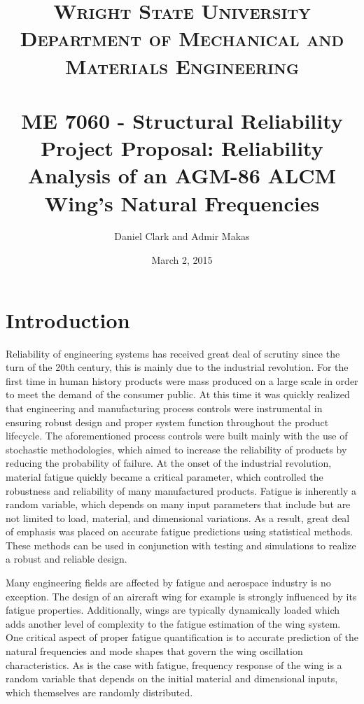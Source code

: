 \documentclass[paper=a4, fontsize=12pt]{scrartcl} %
\title{	
\normalfont \normalsize 
\textsc{Wright State University\\ Department of Mechanical and Materials Engineering} \\ [25pt] %
\horrule{0.5pt} \\[0.4cm] %
\huge ME 7060 - Structural Reliability \\ %
\Large Project Proposal: Reliability Analysis of an AGM-86 ALCM Wing's Natural Frequencies
\horrule{2pt} \\[0.5cm] %
}
\author{Daniel Clark and Admir Makas} %
\date{\normalsize March 2, 2015} %
\begin{document}
\maketitle %

\section*{Introduction}
Reliability of engineering systems has received great deal of scrutiny since the turn of the 20th century, this is mainly due to the industrial revolution. For the first time in human history products were mass produced on a large scale in order to meet the demand of the consumer public. At this time it was quickly realized that engineering and manufacturing process controls were instrumental in ensuring robust design and proper system function throughout the product lifecycle. The aforementioned process controls were built mainly with the use of stochastic methodologies, which aimed to increase the reliability of products by reducing the probability of failure. At the onset of the industrial revolution, material fatigue quickly became a critical parameter, which controlled the robustness and reliability of many manufactured products. Fatigue is inherently a random variable, which depends on many input parameters that include but are not limited to load, material, and dimensional variations. As a result, great deal of emphasis was placed on accurate fatigue predictions using statistical methods. These methods can be used in conjunction with testing and simulations to realize a robust and reliable design.

Many engineering fields are affected by fatigue and aerospace industry is no exception. The design of an aircraft wing for example is strongly influenced by its fatigue properties. Additionally, wings are typically dynamically loaded which adds another level of complexity to the fatigue estimation of the wing system. One critical aspect of proper fatigue quantification is to accurate prediction of the natural frequencies and mode shapes that govern the wing oscillation characteristics. As is the case with fatigue, frequency response of the wing is a random variable that depends on the initial material and dimensional inputs, which themselves are randomly distributed. 
\end{document}
